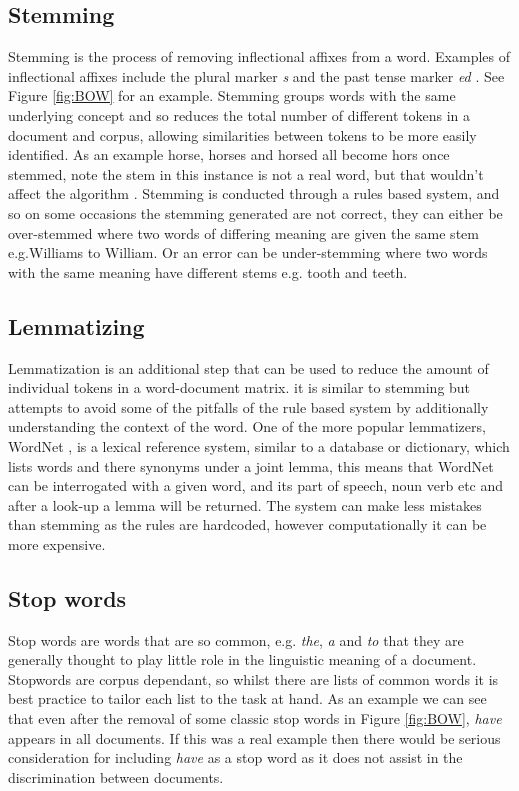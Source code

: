 \subsection{Stemming} Stemming is the process of removing inflectional affixes from a word. Examples of inflectional affixes include the plural marker \emph{s} and the past tense marker \emph{ed} \parencite{eisenstein2018natural}. See Figure \ref{fig:BOW} for an example. Stemming groups words with the same underlying concept and so reduces the total number of different tokens in a document and corpus, allowing similarities between tokens to be more easily identified. As an example horse, horses and horsed all become hors once stemmed, note the stem in this instance is not a real word, but that wouldn't affect the algorithm \parencite{jivani2011comparative}. Stemming is conducted through a rules based system, and so on some occasions the stemming generated are not correct, they can either be over-stemmed where two words of differing meaning are given the same stem e.g.Williams to William. Or an error can be under-stemming where two words with the same meaning have different stems e.g. tooth and teeth. 

\subsection{Lemmatizing} Lemmatization is an additional step that can be used to reduce the amount of individual tokens in a word-document matrix. it is similar to stemming but attempts to avoid some of the pitfalls of the rule based system by additionally understanding the context of the word. One of the more popular lemmatizers, WordNet \parencite{MillerGeorgeA1990ItWA}, is a lexical reference system, similar to a database or dictionary, which lists words and there synonyms under a joint lemma, this means that WordNet can be interrogated with a given word, and its part of speech, noun verb etc and after a look-up a lemma will be returned. The system can make less mistakes than stemming as the rules are hardcoded, however computationally it can be more expensive. 

\subsection{Stop words} Stop words are words that are so common, e.g. \emph{the}, \emph{a} and \emph{to} that they are generally thought to play little role in the linguistic meaning of a document. Stopwords are corpus dependant, so whilst there are lists of common words it is best practice to tailor each list to the task at hand. As an example we can see that even after the removal of some classic stop words in Figure \ref{fig:BOW}, \emph{have} appears in all documents. If this was a real example then there would be serious consideration for including \emph{have} as a stop word as it does not assist in the discrimination between documents. 

